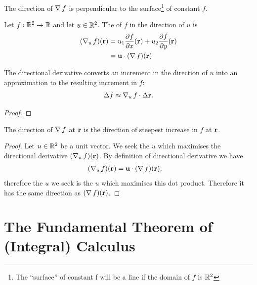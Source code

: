 \begin{theorem*}
  The direction of $\operatorname{\nabla} f$ is perpendicular to the surface\footnote{The
    ``surface'' of constant f will be a line if the domain of $f$ is
    $\mathbb{R}^2$} of constant $f$.
\end{theorem*}



\begin{definition*}
  Let $f:\mathbb{R}^2 \to \mathbb{R}$ and let $u \in \mathbb{R}^2$. The 
  of $f$ in the direction of $u$ is
  \begin{align*}
    (\operatorname{\nabla}_u f)(\mathbf{r})
    &= u_1\frac{\partial f}{\partial x}(\mathbf{r}) + u_2\frac{\partial f}{\partial y}(\mathbf{r}) \\
    &= \mathbf{u} \cdot (\operatorname{\nabla} f)(\mathbf{r})
  \end{align*}
\end{definition*}

\begin{theorem*}
  The directional derivative converts an increment in the direction of $u$ into an approximation to
  the resulting increment in $f$:
  \begin{align*}
    \Delta f \approx \operatorname{\nabla}_u f \cdot \Delta \mathbf{r}.
  \end{align*}
\end{theorem*}

\begin{proof}
  \todo{}
\end{proof}

\begin{theorem*}
  The direction of $\operatorname{\nabla} f$ at $\mathbf{r}$ is the direction of steepest increase in $f$ at $\mathbf{r}$.
\end{theorem*}

\begin{proof}
  Let $u \in \mathbb{R}^2$ be a unit vector. We seek the $u$ which maximises the directional derivative
  $(\operatorname{\nabla}_u f)(\mathbf{r})$. By definition of directional derivative we have
  \begin{align*}
    (\operatorname{\nabla}_u f)(\mathbf{r}) &= \mathbf{u} \cdot (\operatorname{\nabla} f)(\mathbf{r}),
  \end{align*}
  therefore the $u$ we seek is the $u$ which maximises this dot product. Therefore it has the same
  direction as $(\operatorname{\nabla} f)(\mathbf{r})$.
\end{proof}




\newpage
\section{The Fundamental Theorem of (Integral) Calculus}

